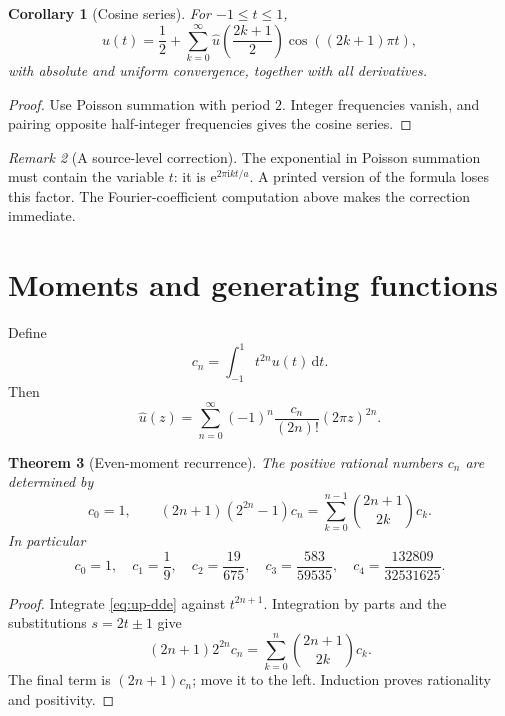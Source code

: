 \documentclass[11pt]{article}
\newtheorem{theorem}{Theorem}[section]
\newtheorem{corollary}[theorem]{Corollary}
\theoremstyle{definition}
\theoremstyle{remark}
\newtheorem{remark}[theorem]{Remark}
\newcommand{\dd}{\,\mathrm d}\newcommand{\e}{\mathrm e}\newcommand{\ii}{\mathrm i}
\begin{document}
\begin{corollary}[Cosine series]\label{cor:cosine}
For $-1\le t\le1$,
\begin{equation}\label{eq:cosine}
 u(t)=\frac12+\sum_{k=0}^{\infty}
 \widehat u\!\left(\frac{2k+1}{2}\right)
 \cos((2k+1)\pi t),
\end{equation}
with absolute and uniform convergence, together with all derivatives.
\end{corollary}
\begin{proof}
Use Poisson summation with period $2$.  Integer frequencies vanish, and pairing opposite half-integer frequencies gives the cosine series.
\end{proof}

\begin{remark}[A source-level correction]
The exponential in Poisson summation must contain the variable $t$: it is $\e^{2\pi\ii kt/a}$.  A printed version of the formula loses this factor.  The Fourier-coefficient computation above makes the correction immediate.
\end{remark}

\section{Moments and generating functions}\label{sec:moments}
Define
\begin{equation}\label{eq:c-def}
 c_n=\int_{-1}^{1}t^{2n}u(t)\dd t.
\end{equation}
Then
\begin{equation}\label{eq:fourier-moment-series}
 \widehat u(z)=\sum_{n=0}^{\infty}(-1)^n
 \frac{c_n}{(2n)!}(2\pi z)^{2n}.
\end{equation}

\begin{theorem}[Even-moment recurrence]\label{thm:c-recurrence}
The positive rational numbers $c_n$ are determined by
\begin{equation}\label{eq:c-recurrence}
 c_0=1,
 \qquad
 (2n+1)(2^{2n}-1)c_n
 =\sum_{k=0}^{n-1}\binom{2n+1}{2k}c_k.
\end{equation}
In particular
\[
 c_0=1,
 \quad c_1=\frac19,
 \quad c_2=\frac{19}{675},
 \quad c_3=\frac{583}{59535},
 \quad c_4=\frac{132809}{32531625}.
\]
\end{theorem}
\begin{proof}
Integrate \eqref{eq:up-dde} against $t^{2n+1}$.  Integration by parts and the substitutions $s=2t\pm1$ give
\[
 (2n+1)2^{2n}c_n=\sum_{k=0}^{n}\binom{2n+1}{2k}c_k.
\]
The final term is $(2n+1)c_n$; move it to the left.  Induction proves rationality and positivity.
\end{proof}
\end{document}
